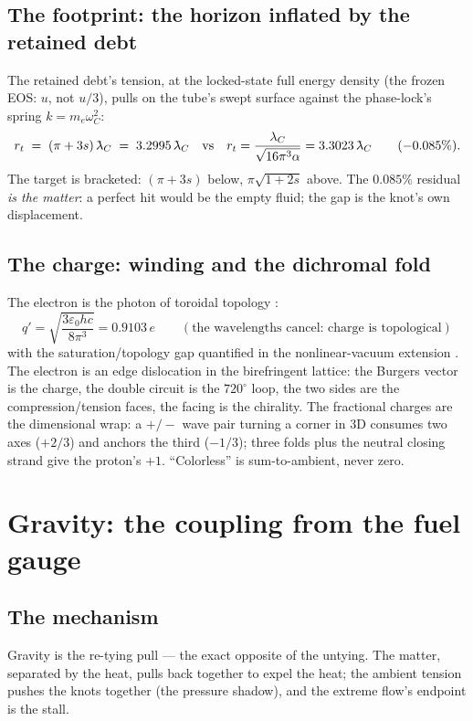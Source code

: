 \documentclass[11pt, a4paper]{article}
\newcommand{\snot}{\ensuremath{s}}
\newcommand{\lambdabar}{{\mathchar'26\mkern -9mu\lambda}} %
\begin{document}
\subsection{The footprint: the horizon inflated by the retained debt}
The retained debt's tension, at the locked-state full energy density (the frozen
EOS: $u$, not $u/3$), pulls on the tube's swept surface against the phase-lock's
spring $k = m_e\omega_C^2$:
\begin{equation}
r_t \;=\; (\pi + 3\snot)\,\lambdabar_C \;=\; 3.2995\,\lambdabar_C
\quad \text{vs}\quad r_t = \frac{\lambda_C}{\sqrt{16\pi^3\alpha}} = 3.3023\,\lambdabar_C
\qquad (-0.085\%).
\end{equation}
The target is bracketed: $(\pi+3\snot)$ below, $\pi\sqrt{1+2\snot}$ above. The
$0.085\%$ residual \emph{is the matter}: a perfect hit would be the empty fluid;
the gap is the knot's own displacement.

\subsection{The charge: winding and the dichromal fold}
The electron is the photon of toroidal topology \cite{williamson1997}:
\begin{equation}
q' = \sqrt{\frac{3\varepsilon_0 h c}{8\pi^3}} = 0.9103\,e
\qquad (\text{the wavelengths cancel: charge is topological})
\end{equation}
with the saturation/topology gap quantified in the nonlinear-vacuum extension
\cite{lai2026}. The electron is an edge dislocation in the birefringent lattice:
the Burgers vector is the charge, the double circuit is the $720^\circ$ loop, the
two sides are the compression/tension faces, the facing is the chirality. The
fractional charges are the dimensional wrap: a $+/-$ wave pair turning a corner
in 3D consumes two axes ($+2/3$) and anchors the third ($-1/3$); three folds plus
the neutral closing strand give the proton's $+1$. ``Colorless'' is
sum-to-ambient, never zero.

\section{Gravity: the coupling from the fuel gauge}
\label{sec:gravity}

\subsection{The mechanism}
Gravity is the re-tying pull --- the exact opposite of the untying. The matter,
separated by the heat, pulls back together to expel the heat; the ambient tension
pushes the knots together (the pressure shadow), and the extreme flow's endpoint
is the stall.
\end{document}
